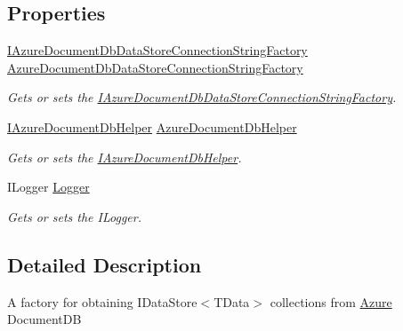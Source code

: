 \subsection*{Properties}
\begin{DoxyCompactItemize}
\item 
\hyperlink{interfaceCqrs_1_1Azure_1_1DocumentDb_1_1Factories_1_1IAzureDocumentDbDataStoreConnectionStringFactory}{I\+Azure\+Document\+Db\+Data\+Store\+Connection\+String\+Factory} \hyperlink{classCqrs_1_1Azure_1_1DocumentDb_1_1Factories_1_1AzureDocumentDbDataStoreFactory_ae5d98dfa935092643fe451ca64cd84e7_ae5d98dfa935092643fe451ca64cd84e7}{Azure\+Document\+Db\+Data\+Store\+Connection\+String\+Factory}
\begin{DoxyCompactList}\small\item\em Gets or sets the \hyperlink{interfaceCqrs_1_1Azure_1_1DocumentDb_1_1Factories_1_1IAzureDocumentDbDataStoreConnectionStringFactory}{I\+Azure\+Document\+Db\+Data\+Store\+Connection\+String\+Factory}. \end{DoxyCompactList}\item 
\hyperlink{interfaceCqrs_1_1Azure_1_1DocumentDb_1_1IAzureDocumentDbHelper}{I\+Azure\+Document\+Db\+Helper} \hyperlink{classCqrs_1_1Azure_1_1DocumentDb_1_1Factories_1_1AzureDocumentDbDataStoreFactory_a0fd0cb66b802fd374dbf8f89e7cdfbdc_a0fd0cb66b802fd374dbf8f89e7cdfbdc}{Azure\+Document\+Db\+Helper}
\begin{DoxyCompactList}\small\item\em Gets or sets the \hyperlink{interfaceCqrs_1_1Azure_1_1DocumentDb_1_1IAzureDocumentDbHelper}{I\+Azure\+Document\+Db\+Helper}. \end{DoxyCompactList}\item 
I\+Logger \hyperlink{classCqrs_1_1Azure_1_1DocumentDb_1_1Factories_1_1AzureDocumentDbDataStoreFactory_af0e1e5053d7d5d076de970c579b1f1bb_af0e1e5053d7d5d076de970c579b1f1bb}{Logger}
\begin{DoxyCompactList}\small\item\em Gets or sets the I\+Logger. \end{DoxyCompactList}\end{DoxyCompactItemize}


\subsection{Detailed Description}
A factory for obtaining I\+Data\+Store$<$\+T\+Data$>$ collections from \hyperlink{namespaceCqrs_1_1Azure}{Azure} Document\+DB 



